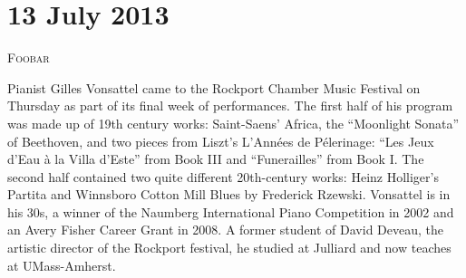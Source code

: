 \chapter{13 July 2013}

\textsc{Foobar}

Pianist Gilles Vonsattel came to the Rockport Chamber Music Festival on Thursday as part of its final week of performances. The first half of his program was made up of 19th century works: Saint-Saens’ Africa, the “Moonlight Sonata” of Beethoven, and two pieces from Liszt’s L’Années de Pélerinage: “Les Jeux d’Eau à la Villa d’Este” from Book III and “Funerailles” from Book I. The second half contained two quite different 20th-century works: Heinz Holliger’s Partita and Winnsboro Cotton Mill Blues by Frederick Rzewski. Vonsattel is in his 30s, a winner of the Naumberg International Piano Competition in 2002 and an Avery Fisher Career Grant in 2008. A former student of David Deveau, the artistic director of the Rockport festival, he studied at Julliard and now teaches at UMass-Amherst.

